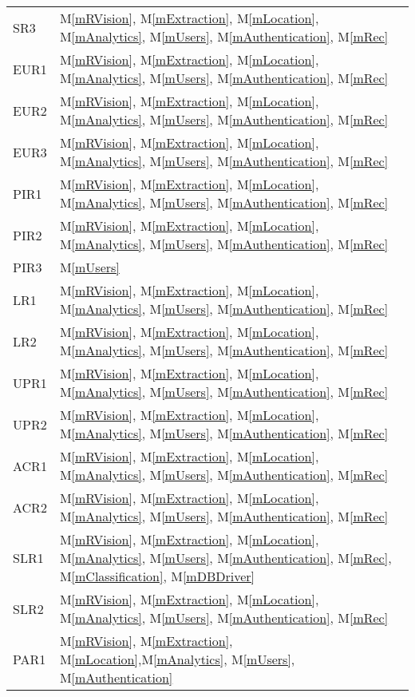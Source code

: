\documentclass[12pt, titlepage]{article}
\newcommand{\mref}[1]{M\ref{#1}}
\begin{document}
\begin{longtable}{p{} p{}}
SR3 & \mref{mRVision}, \mref{mExtraction}, \mref{mLocation}, \mref{mAnalytics}, \mref{mUsers}, \mref{mAuthentication}, \mref{mRec}\\
EUR1 & \mref{mRVision}, \mref{mExtraction}, \mref{mLocation}, \mref{mAnalytics}, \mref{mUsers}, \mref{mAuthentication}, \mref{mRec}\\
EUR2 & \mref{mRVision}, \mref{mExtraction}, \mref{mLocation}, \mref{mAnalytics}, \mref{mUsers}, \mref{mAuthentication}, \mref{mRec}\\
EUR3 & \mref{mRVision}, \mref{mExtraction}, \mref{mLocation}, \mref{mAnalytics}, \mref{mUsers}, \mref{mAuthentication}, \mref{mRec}\\
PIR1 & \mref{mRVision}, \mref{mExtraction}, \mref{mLocation}, \mref{mAnalytics}, \mref{mUsers}, \mref{mAuthentication}, \mref{mRec}\\
PIR2 & \mref{mRVision}, \mref{mExtraction}, \mref{mLocation}, \mref{mAnalytics}, \mref{mUsers}, \mref{mAuthentication}, \mref{mRec}\\
PIR3 & \mref{mUsers}\\
LR1 & \mref{mRVision}, \mref{mExtraction}, \mref{mLocation}, \mref{mAnalytics}, \mref{mUsers}, \mref{mAuthentication}, \mref{mRec}\\
LR2 & \mref{mRVision}, \mref{mExtraction}, \mref{mLocation}, \mref{mAnalytics}, \mref{mUsers}, \mref{mAuthentication}, \mref{mRec}\\
UPR1 & \mref{mRVision}, \mref{mExtraction}, \mref{mLocation}, \mref{mAnalytics}, \mref{mUsers}, \mref{mAuthentication}, \mref{mRec}\\
UPR2 & \mref{mRVision}, \mref{mExtraction}, \mref{mLocation}, \mref{mAnalytics}, \mref{mUsers}, \mref{mAuthentication}, \mref{mRec}\\
ACR1 & \mref{mRVision}, \mref{mExtraction}, \mref{mLocation}, \mref{mAnalytics}, \mref{mUsers}, \mref{mAuthentication}, \mref{mRec}\\
ACR2 & \mref{mRVision}, \mref{mExtraction}, \mref{mLocation}, \mref{mAnalytics}, \mref{mUsers}, \mref{mAuthentication}, \mref{mRec}\\
SLR1 & \mref{mRVision}, \mref{mExtraction}, \mref{mLocation}, \mref{mAnalytics}, \mref{mUsers}, \mref{mAuthentication}, \mref{mRec}, \mref{mClassification}, \mref{mDBDriver}\\
SLR2 & \mref{mRVision}, \mref{mExtraction}, \mref{mLocation}, \mref{mAnalytics}, \mref{mUsers}, \mref{mAuthentication}, \mref{mRec}\\
PAR1 & \mref{mRVision}, \mref{mExtraction}, \mref{mLocation},\mref{mAnalytics}, \mref{mUsers}, \mref{mAuthentication}\\

\end{longtable}
\end{document}
